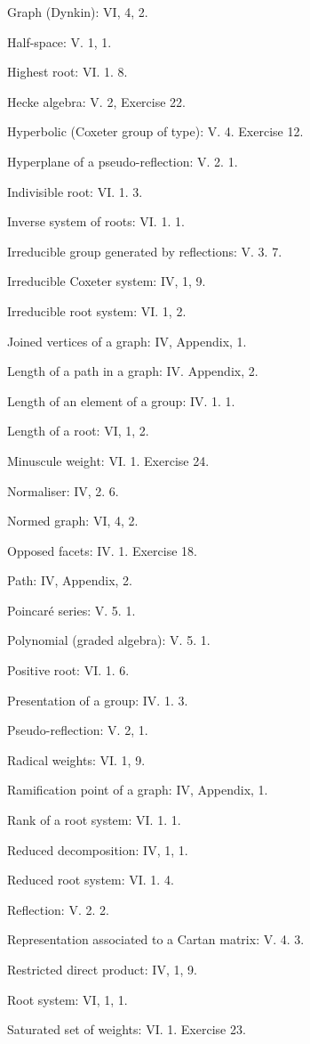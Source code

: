 Graph (Dynkin): VI, 4, 2.

Half-space: V. 1, 1.

Highest root: VI. 1. 8.

Hecke algebra: V. 2, Exercise 22.

Hyperbolic (Coxeter group of type): V. 4. Exercise 12.

Hyperplane of a pseudo-reflection: V. 2. 1.

Indivisible root: VI. 1. 3.

Inverse system of roots: VI. 1. 1.

Irreducible group generated by reflections: V. 3. 7.

Irreducible Coxeter system: IV, 1, 9.

Irreducible root system: VI. 1, 2.

Joined vertices of a graph: IV, Appendix, 1.

Length of a path in a graph: IV. Appendix, 2.

Length of an element of a group: IV. 1. 1.

Length of a root: VI, 1, 2.

Minuscule weight: VI. 1. Exercise 24.

Normaliser: IV, 2. 6.

Normed graph: VI, 4, 2.

Opposed facets: IV. 1. Exercise 18.

Path: IV, Appendix, 2.

Poincaré series: V. 5. 1.

Polynomial (graded algebra): V. 5. 1.

Positive root: VI. 1. 6.

Presentation of a group: IV. 1. 3.

Pseudo-reflection: V. 2, 1.

Radical weights: VI. 1, 9.

Ramification point of a graph: IV, Appendix, 1.

Rank of a root system: VI. 1. 1.

Reduced decomposition: IV, 1, 1.

Reduced root system: VI. 1. 4.

Reflection: V. 2. 2.

Representation associated to a Cartan matrix: V. 4. 3.

Restricted direct product: IV, 1, 9.

Root system: VI, 1, 1.

Saturated set of weights: VI. 1. Exercise 23.

